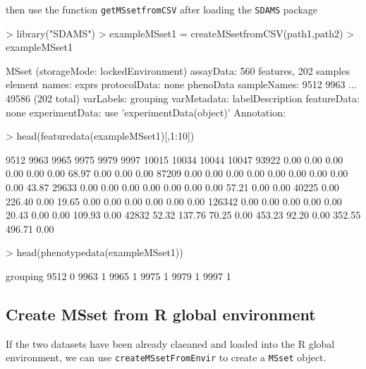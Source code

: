 \documentclass[12pt]{article}
\begin{document}
then use the function {\tt getMSsetfromCSV} after loading the {\tt SDAMS}
package
\begin{Schunk}
\begin{Sinput}
> library("SDAMS")
> exampleMSset1 = createMSsetfromCSV(path1,path2)
> exampleMSset1
\end{Sinput}
\begin{Soutput}
MSset (storageMode: lockedEnvironment)
assayData: 560 features, 202 samples 
  element names: exprs 
protocolData: none
phenoData
  sampleNames: 9512 9963 ... 49586 (202 total)
  varLabels: grouping
  varMetadata: labelDescription
featureData: none
experimentData: use 'experimentData(object)'
Annotation:  
\end{Soutput}
\begin{Sinput}
> head(featuredata(exampleMSset1)[,1:10])
\end{Sinput}
\begin{Soutput}
        9512   9963  9965  9975   9979  9997 10015  10034  10044 10047
93922   0.00   0.00  0.00  0.00   0.00  0.00 68.97   0.00   0.00  0.00
87209   0.00   0.00  0.00  0.00   0.00  0.00  0.00   0.00   0.00 43.87
29633   0.00   0.00  0.00  0.00   0.00  0.00  0.00  57.21   0.00  0.00
40225   0.00 226.40  0.00 19.65   0.00  0.00  0.00   0.00   0.00  0.00
126342  0.00   0.00  0.00  0.00   0.00 20.43  0.00   0.00 109.93  0.00
42832  52.32 137.76 70.25  0.00 453.23 92.20  0.00 352.55 496.71  0.00
\end{Soutput}
\begin{Sinput}
> head(phenotypedata(exampleMSset1))
\end{Sinput}
\begin{Soutput}
     grouping
9512        0
9963        1
9965        1
9975        1
9979        1
9997        1
\end{Soutput}
\end{Schunk}



\subsection{Create MSset from R global environment}
If the two datasets have been already claeaned and loaded into the R global
environment, we can use {\tt createMSsetFromEnvir} to create a {\tt MSset} object.
\end{document}
